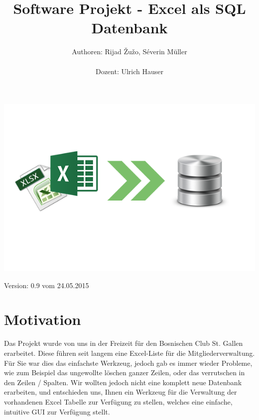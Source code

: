 \documentclass{article}
\begin{document}
\begin{titlepage}



\title{Software Projekt - Excel als SQL Datenbank}
\author{Authoren: Rijad \v{Z}u\v{z}o, Séverin Müller \\ \\ Dozent: Ulrich Hauser}



\date{} 
\clearpage\maketitle
\thispagestyle{empty}

\vspace{80mm}
\begin{center}
		\includegraphics[width=0.8 \textwidth]{SoftwareLogo}
\end{center}
\centering Version: 0.9 vom 24.05.2015
\end{titlepage}
\newpage
\tableofcontents
\listoffigures
\newpage


\section{Motivation}
Das Projekt wurde von uns in der Freizeit für den Bosnischen Club St. Gallen erarbeitet. Diese führen seit langem eine Excel-Liste für die Mitgliederverwaltung. \newline 
Für Sie war dies das einfachste Werkzeug, jedoch gab es immer wieder Probleme, wie zum Beispiel das ungewollte löschen ganzer Zeilen, oder das verrutschen in den Zeilen / Spalten. Wir wollten jedoch nicht eine komplett neue Datenbank erarbeiten, und entschieden uns, Ihnen ein Werkzeug für die Verwaltung der vorhandenen Excel Tabelle zur Verfügung zu stellen, welches eine einfache, intuitive GUI zur Verfügung stellt.
\end{document}
